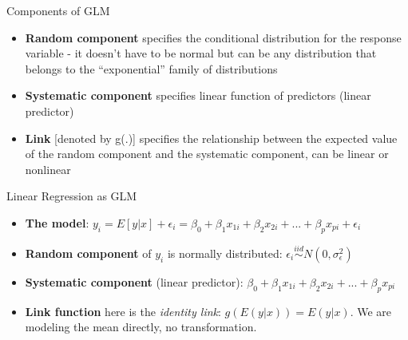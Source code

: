 \documentclass[ignorenonframetext,]{beamer}
\providecommand{\tightlist}{%
  \setlength{\itemsep}{0pt}\setlength{\parskip}{0pt}}
\begin{document}
\begin{frame}{Components of GLM}
\protect\hypertarget{components-of-glm}{}

\begin{itemize}
\tightlist
\item
  \textbf{Random component} specifies the conditional distribution for
  the response variable - it doesn't have to be normal but can be any
  distribution that belongs to the ``exponential'' family of
  distributions
\item
  \textbf{Systematic component} specifies linear function of predictors
  (linear predictor)
\item
  \textbf{Link} {[}denoted by g(.){]} specifies the relationship between
  the expected value of the random component and the systematic
  component, can be linear or nonlinear
\end{itemize}

\end{frame}

\begin{frame}{Linear Regression as GLM}
\protect\hypertarget{linear-regression-as-glm}{}

\begin{itemize}
\item
  \textbf{The model}:
  \(y_i = E[y|x] + \epsilon_i = \beta_0 + \beta_1 x_{1i} + \beta_2 x_{2i} + ... + \beta_p x_{pi} + \epsilon_i\)
\item
  \textbf{Random component} of \(y_i\) is normally distributed:
  \(\epsilon_i \stackrel{iid}{\sim} N(0, \sigma_\epsilon^2)\)
\item
  \textbf{Systematic component} (linear predictor):
  \(\beta_0 + \beta_1 x_{1i} + \beta_2 x_{2i} + ... + \beta_p x_{pi}\)
\item
  \textbf{Link function} here is the \emph{identity link}:
  \(g(E(y | x)) = E(y | x)\). We are modeling the mean directly, no
  transformation.
\end{itemize}

\end{frame}
\end{document}
